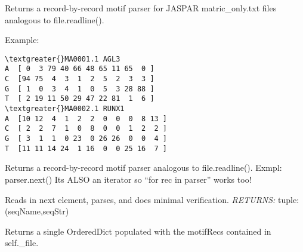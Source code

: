 \documentclass[letterpaper,10pt,english]{sphinxmanual}
\begin{document}
\begin{fulllineitems}
\label{code:gfunc.parsers.JASPAR.ParseJasparMatrixOnly}
Returns a record-by-record motif parser for JASPAR matric\_only.txt files analogous to file.readline().

Example:

\begin{Verbatim}[commandchars=\\\{\}]
\textgreater{}MA0001.1 AGL3
A  [ 0  3 79 40 66 48 65 11 65  0 ]
C  [94 75  4  3  1  2  5  2  3  3 ]
G  [ 1  0  3  4  1  0  5  3 28 88 ]
T  [ 2 19 11 50 29 47 22 81  1  6 ]
\textgreater{}MA0002.1 RUNX1
A  [10 12  4  1  2  2  0  0  0  8 13 ]
C  [ 2  2  7  1  0  8  0  0  1  2  2 ]
G  [ 3  1  1  0 23  0 26 26  0  0  4 ]
T  [11 11 14 24  1 16  0  0 25 16  7 ]
\end{Verbatim}

\begin{fulllineitems}
\label{code:gfunc.parsers.JASPAR.ParseJasparMatrixOnly.__init__}
Returns a record-by-record motif parser analogous to file.readline().
Exmpl: parser.next()
Its ALSO an iterator so ``for rec in parser'' works too!

\end{fulllineitems}


\begin{fulllineitems}
\label{code:gfunc.parsers.JASPAR.ParseJasparMatrixOnly.next}
Reads in next element, parses, and does minimal verification.
\emph{RETURNS:} tuple: (seqName,seqStr)

\end{fulllineitems}


\begin{fulllineitems}
\label{code:gfunc.parsers.JASPAR.ParseJasparMatrixOnly.to_dict}
Returns a single OrderedDict populated with the motifRecs
contained in self.\_file.

\end{fulllineitems}


\end{fulllineitems}
\end{document}
